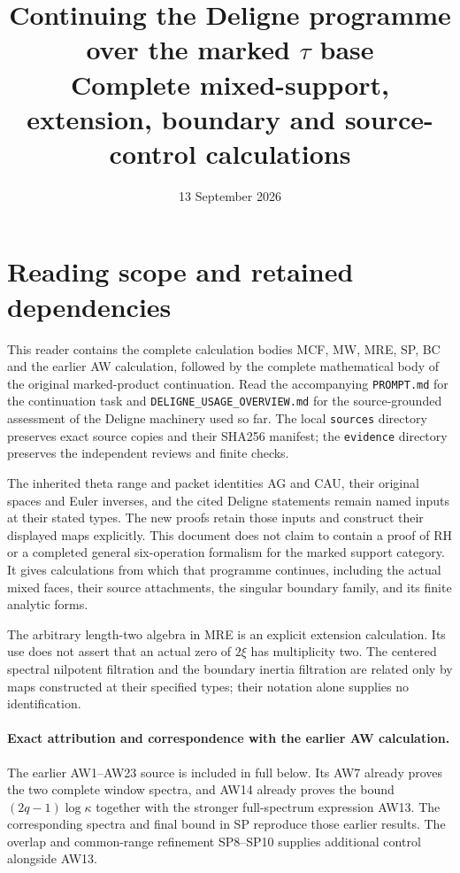 \documentclass[11pt,a4paper]{article}
\title{Continuing the Deligne programme over the marked $\tau$ base\\
Complete mixed-support, extension, boundary and source-control calculations}
\author{}
\date{13 September 2026}
\begin{document}
\maketitle
\section*{Reading scope and retained dependencies}
This reader contains the complete calculation bodies MCF, MW, MRE, SP,
BC and the earlier AW calculation, followed by the complete mathematical body of the original
marked-product continuation. Read the accompanying \texttt{PROMPT.md}
for the continuation task and \texttt{DELIGNE\_USAGE\_OVERVIEW.md} for the
source-grounded assessment of the Deligne machinery used so far.
The local \texttt{sources} directory preserves exact source copies and
their SHA256 manifest; the \texttt{evidence} directory preserves the
independent reviews and finite checks.

The inherited theta range and packet identities AG and CAU, their original
spaces and Euler inverses, and the cited Deligne statements remain named
inputs at their stated types. The new proofs retain those inputs and
construct their displayed maps explicitly. This document does not claim
to contain a proof of RH or a completed general six-operation formalism
for the marked support category. It gives calculations from which that
programme continues, including the actual mixed faces, their source
attachments, the singular boundary family, and its finite analytic forms.

The arbitrary length-two algebra in MRE is an explicit extension
calculation. Its use does not assert that an actual zero of $2\xi$ has
multiplicity two. The centered spectral nilpotent filtration and the
boundary inertia filtration are related only by maps constructed at
their specified types; their notation alone supplies no identification.

\paragraph{Exact attribution and correspondence with the earlier AW calculation.}
The earlier AW1--AW23 source is included in full below. Its AW7 already
proves the two complete window spectra, and AW14 already proves the
bound $(2q-1)\log\kappa$ together with the stronger full-spectrum
expression AW13. The corresponding spectra and final bound in SP
reproduce those earlier results. The overlap and common-range refinement
SP8--SP10 supplies additional control alongside AW13.
\end{document}
